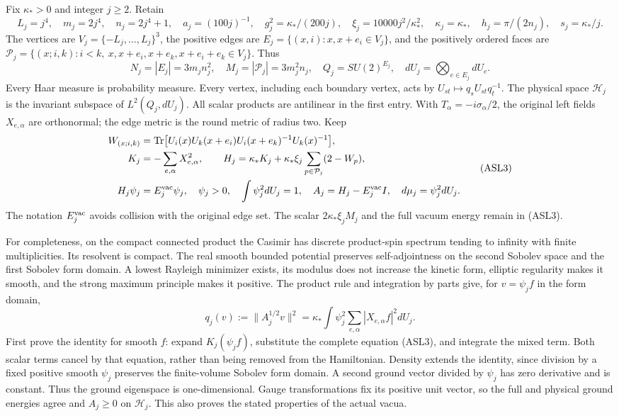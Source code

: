 \documentclass[11pt]{article}
\begin{document}
Fix \(\kappa_*>0\) and integer \(j\ge2\). Retain
\[
 L_j=j^4,\quad m_j=2j^4,\quad n_j=2j^4+1,\quad
 a_j=(100j)^{-1},\quad g_j^2=\kappa_*/(200j),\quad
 \xi_j=10000j^2/\kappa_*^2,\quad \kappa_j=\kappa_*,\quad
 h_j=\pi/(2n_j),\quad s_j=\kappa_*/j.
 \tag{ASL1}
\]
The vertices are \(V_j=\{-L_j,\ldots,L_j\}^3\), the positive edges are \(E_j=\{(x,i):x,x+e_i\in V_j\}\), and the positively ordered faces are \(\mathcal P_j=\{(x;i,k):i<k,\ x,x+e_i,x+e_k,x+e_i+e_k\in V_j\}\). Thus
\[
 N_j=|E_j|=3m_jn_j^2,\quad M_j=|\mathcal P_j|=3m_j^2n_j,\quad
 Q_j=SU(2)^{E_j},\quad dU_j=\bigotimes_{e\in E_j}dU_e.
 \tag{ASL2}
\]
Every Haar measure is probability measure. Every vertex, including each boundary vertex, acts by \(U_{st}\mapsto q_sU_{st}q_t^{-1}\). The physical space \(\mathcal H_j\) is the invariant subspace of \(L^2(Q_j,dU_j)\). All scalar products are antilinear in the first entry. With \(T_\alpha=-i\sigma_\alpha/2\), the original left fields \(X_{e,\alpha}\) are orthonormal; the edge metric is the round metric of radius two. Keep
\[
\begin{aligned}
 W_{(x;i,k)}&=\operatorname{Tr}\bigl[U_i(x)U_k(x+e_i)U_i(x+e_k)^{-1}U_k(x)^{-1}\bigr],\\
 K_j&=-\sum_{e,\alpha}X_{e,\alpha}^2,\qquad
 H_j=\kappa_*K_j+\kappa_*\xi_j\sum_{p\in\mathcal P_j}(2-W_p),\\
 H_j\psi_j&=E_j^{\rm vac}\psi_j,\quad \psi_j>0,\quad
 \int\psi_j^2dU_j=1,\quad A_j=H_j-E_j^{\rm vac}I,\quad
 d\mu_j=\psi_j^2dU_j.
\end{aligned}\tag{ASL3}
\]
The notation \(E_j^{\rm vac}\) avoids collision with the original edge set. The scalar \(2\kappa_*\xi_jM_j\) and the full vacuum energy remain in (ASL3).

For completeness, on the compact connected product the Casimir has discrete product-spin spectrum tending to infinity with finite multiplicities. Its resolvent is compact. The real smooth bounded potential preserves self-adjointness on the second Sobolev space and the first Sobolev form domain. A lowest Rayleigh minimizer exists, its modulus does not increase the kinetic form, elliptic regularity makes it smooth, and the strong maximum principle makes it positive. The product rule and integration by parts give, for \(v=\psi_j f\) in the form domain,
\[
 q_j(v):=\|A_j^{1/2}v\|^2
 =\kappa_*\int\psi_j^2\sum_{e,\alpha}|X_{e,\alpha}f|^2dU_j.
 \tag{ASL4}
\]
First prove the identity for smooth \(f\): expand \(K_j(\psi_jf)\), substitute the complete equation (ASL3), and integrate the mixed term. Both scalar terms cancel by that equation, rather than being removed from the Hamiltonian. Density extends the identity, since division by a fixed positive smooth \(\psi_j\) preserves the finite-volume Sobolev form domain. A second ground vector divided by \(\psi_j\) has zero derivative and is constant. Thus the ground eigenspace is one-dimensional. Gauge transformations fix its positive unit vector, so the full and physical ground energies agree and \(A_j\ge0\) on \(\mathcal H_j\). This also proves the stated properties of the actual vacua.
\end{document}
